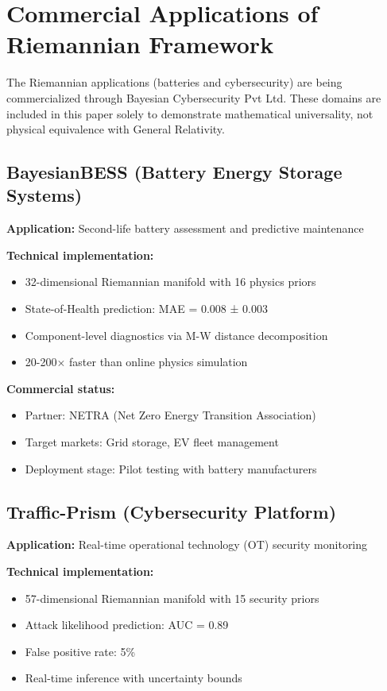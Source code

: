 \documentclass[11pt,a4paper]{article}
\begin{document}
\appendix

\section{Commercial Applications of Riemannian Framework}

The Riemannian applications (batteries and cybersecurity) are being commercialized through Bayesian Cybersecurity Pvt Ltd. These domains are included in this paper solely to demonstrate mathematical universality, not physical equivalence with General Relativity.

\subsection{BayesianBESS (Battery Energy Storage Systems)}

\textbf{Application:} Second-life battery assessment and predictive maintenance

\textbf{Technical implementation:}
\begin{itemize}
\item 32-dimensional Riemannian manifold with 16 physics priors
\item State-of-Health prediction: MAE = 0.008 ± 0.003
\item Component-level diagnostics via M-W distance decomposition
\item 20-200$\times$ faster than online physics simulation
\end{itemize}

\textbf{Commercial status:}
\begin{itemize}
\item Partner: NETRA (Net Zero Energy Transition Association)
\item Target markets: Grid storage, EV fleet management
\item Deployment stage: Pilot testing with battery manufacturers
\end{itemize}

\subsection{Traffic-Prism (Cybersecurity Platform)}

\textbf{Application:} Real-time operational technology (OT) security monitoring

\textbf{Technical implementation:}
\begin{itemize}
\item 57-dimensional Riemannian manifold with 15 security priors
\item Attack likelihood prediction: AUC = 0.89
\item False positive rate: 5\%
\item Real-time inference with uncertainty bounds
\end{itemize}
\end{document}
